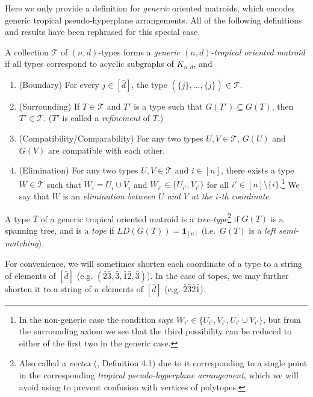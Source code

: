 \documentclass[letterpaper,reqno,11pt]{amsart}
\begin{document}
Here we only provide a definition for \emph{generic} oriented matroids, which encodes generic tropical pseudo-hyperplane arrangements. All of the following definitions and results have been rephrased for this special case.

\begin{definition}
    A collection $\mathcal{T}$ of $(n, d)$-types forms a \emph{generic $(n, d)$-tropical oriented matroid} if all types correspond to acyclic subgraphs of $K_{n, d}$, and \begin{enumerate}
        \item (Boundary) For every $\bar{j}\in [\bar{d}]$, the type $(\{\bar{j}\}, \dots, \{\bar{j}\})\in \mathcal{T}$.
        \item (Surrounding) If $T\in \mathcal{T}$ and $T'$ is a type such that $G(T')\subseteq G(T)$, then $T'\in \mathcal{T}$. ($T'$ is called a \emph{refinement} of $T$.)
        \item (Compatibility/Comparability) For any two types $U, V\in \mathcal{T}$, $G(U)$ and $G(V)$ are compatible with each other.
        \item (Elimination) For any two types $U, V\in \mathcal{T}$ and $i\in [n]$, there exists a type $W\in \mathcal{T}$ such that $W_i = U_i \cup V_i$ and $W_{i'} \in \{U_{i'}, V_{i'}\}$ for all $i'\in [n]\setminus \{i\}$.\footnote{In the non-generic case the condition says $W_{i'} \in \{U_{i'}, V_{i'}, U_{i'}\cup V_{i'}\}$, but from the surrounding axiom we see that the third possibility can be reduced to either of the first two in the generic case.} We say that $W$ is an \emph{elimination between $U$ and $V$ at the $i$-th coordinate}.
    \end{enumerate}
\end{definition}

\begin{definition}
    A type $T$ of a generic tropical oriented matroid is a \emph{tree-type}\footnote{Also called a \emph{vertex} (\cite{TropicalOM}, Definition 4.1) due to it corresponding to a single point in the corresponding \emph{tropical pseudo-hyperplane arrangement}, which we will avoid using to prevent confusion with vertices of polytopes.} if $G(T)$ is a spanning tree, and is a \emph{tope} if $LD(G(T)) = \mathbf{1}_{[n]}$ (i.e.\ $G(T)$ is a \emph{left semi-matching}). 
\end{definition}

For convenience, we will sometimes shorten each coordinate of a type to a string of elements of $[\bar{d}]$ (e.g. $(\bar{2}\bar{3}, \bar{3}, \bar{1}\bar{2}, \bar{3})$). In the case of topes, we may further shorten it to a string of $n$ elements of $[\bar{d}]$ (e.g. $\bar{2}\bar{3}\bar{2}\bar{1}$).
\end{document}
